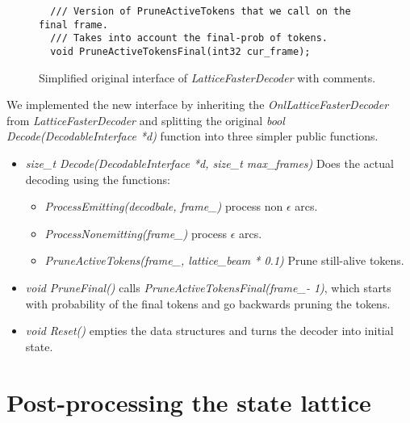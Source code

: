 \begin{figure}[!htp]
\begin{center}
\begin{verbatim}
  /// Version of PruneActiveTokens that we call on the final frame.
  /// Takes into account the final-prob of tokens.
  void PruneActiveTokensFinal(int32 cur_frame);
        \end{verbatim}
        \caption{Simplified original interface of {\it LatticeFasterDecoder}\/ with comments.}
    \label{fig:lattice_decoder} 
    \end{center}
\end{figure}

We implemented the new interface by inheriting the {\it OnlLatticeFasterDecoder}\/ from {\it LatticeFasterDecoder}\/ 
and splitting the original {\it bool Decode(DecodableInterface *d)}\/ function 
into three simpler public functions.
\begin{itemize}
    \item {\it size\_t Decode(DecodableInterface *d, size\_t max\_frames)}\/ 
        Does the actual decoding using the functions:
        \begin{itemize}
            \item {\it ProcessEmitting(decodbale, frame\_)}\/ process non $\epsilon$ arcs.
            \item {\it ProcessNonemitting(frame\_)}\/ process $\epsilon$ arcs.
            \item {\it PruneActiveTokens(frame\_, lattice\_beam * 0.1)}\/ Prune still-alive tokens. 
        \end{itemize}

    \item {\it void PruneFinal()}\/ calls {\it PruneActiveTokensFinal(frame\_- 1)}\/, which starts
        with probability of the final tokens and go backwards pruning the tokens.
    \item {\it void Reset()}\/ empties the data structures and turns the decoder into
        initial state.
\end{itemize}





\section{Post-processing the state lattice}
\label{sec:postprocess}


